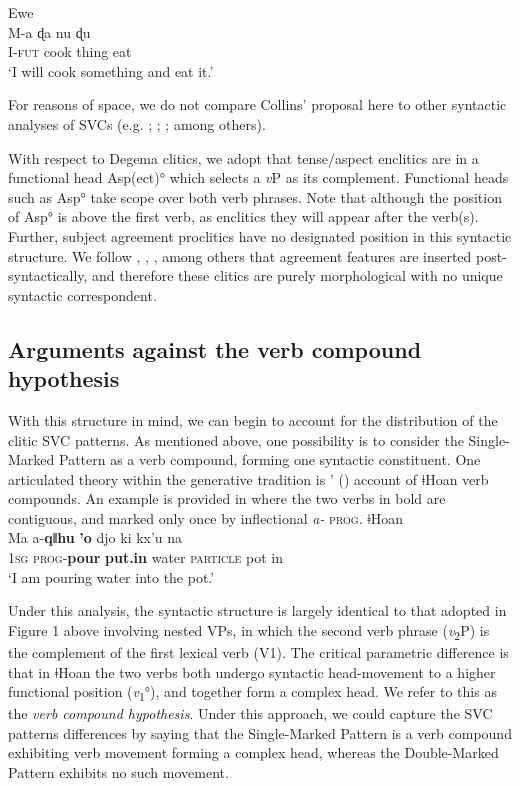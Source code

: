 \documentclass[output=paper]{langsci/langscibook}
\begin{document}
\ea\label{ex:rolle:35} Ewe\\
\gll M-a  ɖa    nu    ɖu \\
     I-\textsc{fut}  cook  thing  eat \\
\glt ‘I will cook something and eat it.’ \citep[490-491]{Collins1997}
\z

For reasons of space, we do not compare Collins’ proposal here to other syntactic analyses of SVCs (e.g. \citealt{Baker1989};  \citealt{HiraiwaBodomo2008}; \citealt{Aboh2009}; among others). 

With respect to Degema clitics, we adopt that tense/aspect enclitics are in a functional head Asp(ect)° which selects a \textit{v}P as its complement. Functional heads such as Asp° take scope over both verb phrases. Note that although the position of Asp° is above the first verb, as enclitics they will appear after the verb(s). Further, subject agreement proclitics have no designated position in this syntactic structure. We follow \citet{EmbickNoyer2007}, \citet{Kramer2010}, \citet{Norris2014}, among others that agreement features are inserted post-syntactically, and therefore these clitics are purely morphological with no unique syntactic correspondent. 

\subsection{Arguments against the verb compound hypothesis}
\label{bkm:Ref449523633}
With this structure in mind, we can begin to account for the distribution of the clitic SVC patterns. As mentioned above, one possibility is to consider the Single-Marked Pattern as a verb compound, forming one syntactic constituent. One articulated theory within the generative tradition is \citeauthor{Collins2002}’ (\citeyear*{Collins2002}) account of ǂHoan verb compounds. An example is provided in  where the two verbs in bold are contiguous, and marked only once by inflectional \textit{a-} \textsc{prog}.
\ea\label{ex:rolle:36} ǂHoan \\
\gll  Ma  a-\textbf{qǁhu}    \textbf{{\textbar}’o}    djo    ki      kx’u    na\\
     \textsc{1sg}   \textsc{prog}{}-\textbf{pour}  \textbf{put.in}  water  \textsc{particle}  pot    in\\
\glt ‘I am pouring water into the pot.’ \citep[1]{Collins2002}
\z

Under this analysis, the syntactic structure is largely identical to that adopted in Figure 1 above involving nested VPs, in which the second verb phrase (\textit{v}\textsubscript{2}P) is the complement of the first lexical verb (V1). The critical parametric difference is that in ǂHoan the two verbs both undergo syntactic head-movement to a higher functional position (\textit{v}\textsubscript{1}°), and together form a complex head. We refer to this as the \textit{verb compound hypothesis}. Under this approach, we could capture the SVC patterns differences by saying that the Single-Marked Pattern is a verb compound exhibiting verb movement forming a complex head, whereas the Double-Marked Pattern exhibits no such movement. 
\end{document}
